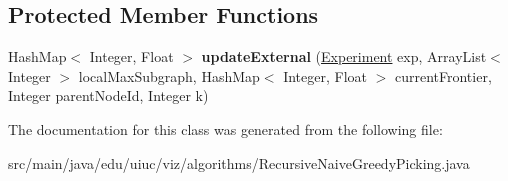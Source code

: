 \subsection*{Protected Member Functions}
\begin{DoxyCompactItemize}
\item 
\mbox{\label{classedu_1_1uiuc_1_1viz_1_1algorithms_1_1_recursive_naive_greedy_picking_a223e7c7904236d36437fd8189e27128a}} 
Hash\+Map$<$ Integer, Float $>$ {\bfseries update\+External} (\mbox{\hyperlink{classedu_1_1uiuc_1_1viz_1_1algorithms_1_1_experiment}{Experiment}} exp, Array\+List$<$ Integer $>$ local\+Max\+Subgraph, Hash\+Map$<$ Integer, Float $>$ current\+Frontier, Integer parent\+Node\+Id, Integer k)
\end{DoxyCompactItemize}


The documentation for this class was generated from the following file\+:\begin{DoxyCompactItemize}
\item 
src/main/java/edu/uiuc/viz/algorithms/Recursive\+Naive\+Greedy\+Picking.\+java\end{DoxyCompactItemize}
